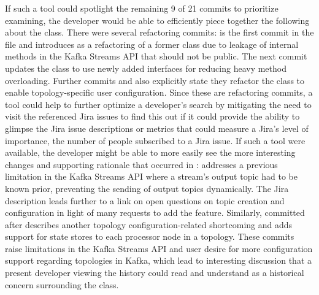 If such a tool could spotlight the remaining 9 of 21 commits to prioritize examining, the developer would be able to efficiently piece together the following about the  class. 
There were several refactoring commits:  is the first commit in the file and introduces  as a refactoring of a former class due to leakage of internal methods in the Kafka Streams API that should not be public. 
The next commit  updates the  class to use newly added interfaces for reducing heavy method overloading.
Further commits  and  also explicitly state they refactor the  class to enable topology-specific user configuration.
Since these are refactoring commits, a tool could help to further optimize a developer's search by mitigating the need to visit the referenced Jira issues to find this out if it could provide the ability to glimpse the Jira issue descriptions or metrics that could measure a Jira's level of importance, \eg the number of people subscribed to a Jira issue.
If such a tool were available, the developer might be able to more easily see the more interesting changes and supporting rationale that occurred in :
 addresses a previous limitation in the Kafka Streams API where a stream's output topic had to be known prior, preventing the sending of output topics dynamically. 
The Jira description leads further to a link on open questions on topic creation and configuration in light of many requests to add the feature.
Similarly,  committed after describes another topology configuration-related shortcoming and adds support for state stores to each processor node in a topology.
These commits raise limitations in the Kafka Streams API and user desire for more configuration support regarding topologies in Kafka, which lead to interesting discussion that a present developer viewing the history could read and understand as a historical concern surrounding the  class.

